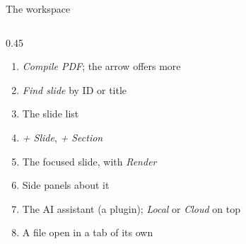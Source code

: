 \begin{standardframe}{The workspace}
\begin{columns}[T,onlytextwidth]
\begin{column}{0.45\linewidth}
\begin{enumerate}
				\item \emph{Compile PDF}; the arrow offers more
				\item \emph{Find slide} by ID or title
				\item The slide list
				\item \emph{+ Slide}, \emph{+ Section}
				\item The focused slide, with \emph{Render}
				\item Side panels about it
				\item The AI assistant (a plugin); \emph{Local} or \emph{Cloud} on top
				\item A file open in a tab of its own
			\end{enumerate}
		\end{column}
	\end{columns}
\end{standardframe}
